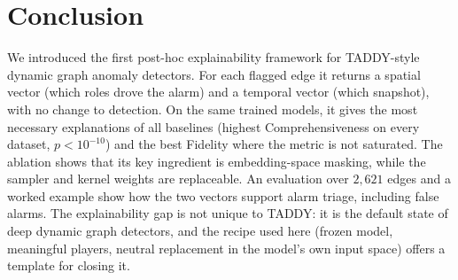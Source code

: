 \documentclass[conference]{IEEEtran}
\begin{document}
\section{Conclusion}
\label{sec:conclusion}
We introduced the first post-hoc explainability framework for TADDY-style
dynamic graph anomaly detectors. For each flagged edge it returns a spatial
vector (which roles drove the alarm) and a temporal vector (which snapshot),
with no change to detection. On the same trained models, it gives the most
necessary explanations of all baselines (highest Comprehensiveness on every
dataset, $p<10^{-10}$) and the best Fidelity where the metric is not saturated.
The ablation shows that its key ingredient is embedding-space masking, while the
sampler and kernel weights are replaceable. An evaluation over $2{,}621$ edges
and a worked example show how the two vectors support alarm triage, including
false alarms. The explainability gap is not unique to TADDY: it is the default
state of deep dynamic graph detectors, and the recipe used here (frozen model,
meaningful players, neutral replacement in the model's own input space)
offers a template for closing it.
\end{document}
